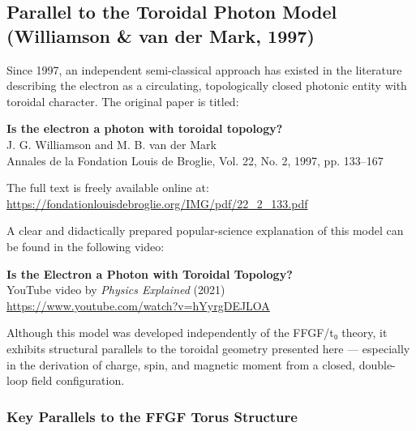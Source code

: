 \subsection{Parallel to the Toroidal Photon Model (Williamson \& van der Mark, 1997)}

Since 1997, an independent semi-classical approach has existed in the literature describing the electron as a circulating, topologically closed photonic entity with toroidal character. The original paper is titled:

\begin{center}
	\textbf{Is the electron a photon with toroidal topology?} \\
	J. G. Williamson and M. B. van der Mark \\
	Annales de la Fondation Louis de Broglie, Vol. 22, No. 2, 1997, pp. 133--167
\end{center}

The full text is freely available online at: \\
\url{https://fondationlouisdebroglie.org/IMG/pdf/22_2_133.pdf}

A clear and didactically prepared popular-science explanation of this model can be found in the following video:

\begin{center}
	\textbf{Is the Electron a Photon with Toroidal Topology?} \\
	YouTube video by \emph{Physics Explained} (2021) \\
	\url{https://www.youtube.com/watch?v=hYyrgDEJLOA}
\end{center}

Although this model was developed independently of the FFGF/t₀ theory, it exhibits structural parallels to the toroidal geometry presented here — especially in the derivation of charge, spin, and magnetic moment from a closed, double-loop field configuration.

\subsubsection{Key Parallels to the FFGF Torus Structure}

